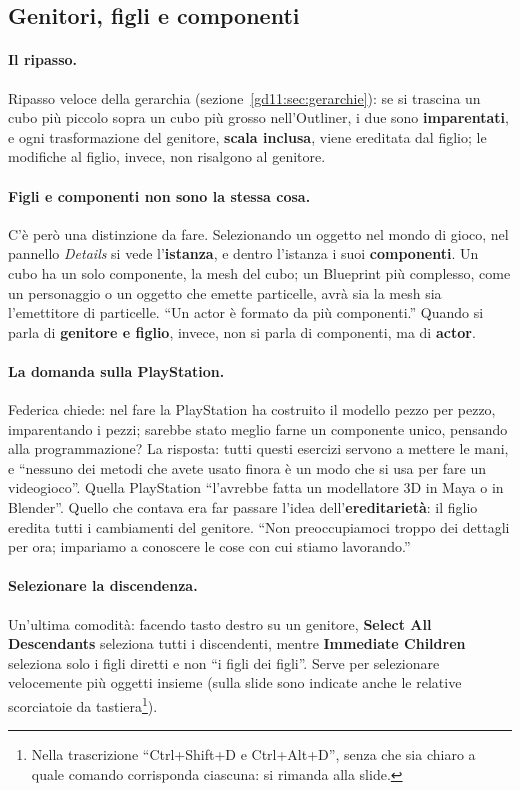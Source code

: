 \subsection{Genitori, figli e componenti}

\paragraph{Il ripasso.} Ripasso veloce della gerarchia
(sezione~\ref{gd11:sec:gerarchie}): se si trascina un cubo più piccolo sopra un
cubo più grosso nell'Outliner, i due sono \textbf{imparentati}, e ogni
trasformazione del genitore, \textbf{scala inclusa}, viene ereditata dal figlio;
le modifiche al figlio, invece, non risalgono al genitore.

\paragraph{Figli e componenti non sono la stessa cosa.} C'è però una distinzione da
fare. Selezionando un oggetto nel mondo di gioco, nel pannello \emph{Details} si
vede l'\textbf{istanza}, e dentro l'istanza i suoi \textbf{componenti}. Un cubo ha un
solo componente, la mesh del cubo; un Blueprint più complesso, come un personaggio
o un oggetto che emette particelle, avrà sia la mesh sia l'emettitore di
particelle. ``Un actor è formato da più componenti.'' Quando si parla di
\textbf{genitore e figlio}, invece, non si parla di componenti, ma di
\textbf{actor}.

\paragraph{La domanda sulla PlayStation.} Federica chiede: nel fare la PlayStation
ha costruito il modello pezzo per pezzo, imparentando i pezzi; sarebbe stato
meglio farne un componente unico, pensando alla programmazione? La risposta: tutti
questi esercizi servono a mettere le mani, e ``nessuno dei metodi che avete usato
finora è un modo che si usa per fare un videogioco''. Quella PlayStation
``l'avrebbe fatta un modellatore 3D in Maya o in Blender''. Quello che contava era
far passare l'idea dell'\textbf{ereditarietà}: il figlio eredita tutti i cambiamenti
del genitore. ``Non preoccupiamoci troppo dei dettagli per ora; impariamo a
conoscere le cose con cui stiamo lavorando.''

\paragraph{Selezionare la discendenza.} Un'ultima comodità: facendo tasto destro su
un genitore, \textbf{Select All Descendants} seleziona tutti i discendenti,
mentre \textbf{Immediate Children} seleziona solo i figli diretti e non ``i figli
dei figli''. Serve per selezionare velocemente più oggetti insieme (sulla slide
sono indicate anche le relative scorciatoie da tastiera\footnote{Nella trascrizione
``Ctrl+Shift+D e Ctrl+Alt+D'', senza che sia chiaro a quale comando corrisponda
ciascuna: si rimanda alla slide.}).

